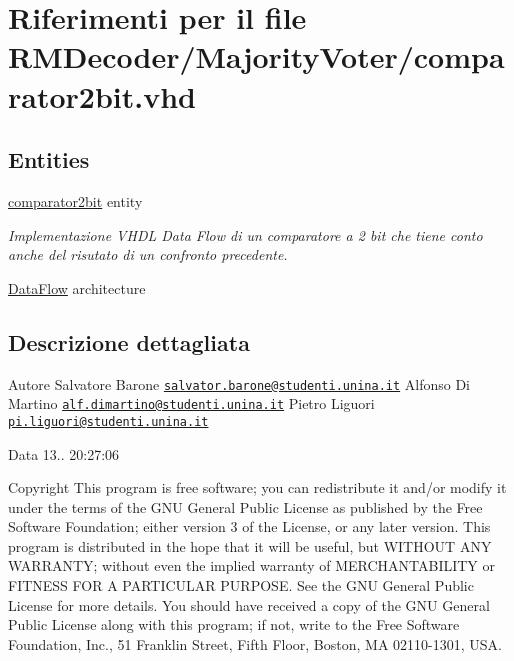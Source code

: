 \hypertarget{comparator2bit_8vhd}{\section{Riferimenti per il file R\+M\+Decoder/\+Majority\+Voter/comparator2bit.vhd}
\label{comparator2bit_8vhd}
}
\subsection*{Entities}
\begin{DoxyCompactItemize}
\item 
\hyperlink{classcomparator2bit}{comparator2bit} entity
\begin{DoxyCompactList}\small\item\em Implementazione V\+H\+D\+L Data Flow di un comparatore a 2 bit che tiene conto anche del risutato di un confronto precedente. \end{DoxyCompactList}\item 
\hyperlink{classcomparator2bit_1_1_data_flow}{Data\+Flow} architecture
\end{DoxyCompactItemize}


\subsection{Descrizione dettagliata}
\begin{DoxyAuthor}{Autore}
Salvatore Barone \href{mailto:salvator.barone@studenti.unina.it}{\tt salvator.\+barone@studenti.\+unina.\+it} Alfonso Di Martino \href{mailto:alf.dimartino@studenti.unina.it}{\tt alf.\+dimartino@studenti.\+unina.\+it} Pietro Liguori \href{mailto:pi.liguori@studenti.unina.it}{\tt pi.\+liguori@studenti.\+unina.\+it} 
\end{DoxyAuthor}
\begin{DoxyDate}{Data}
13.. 20\+:27\+:06
\end{DoxyDate}
\begin{DoxyCopyright}{Copyright}
This program is free software; you can redistribute it and/or modify it under the terms of the G\+N\+U General Public License as published by the Free Software Foundation; either version 3 of the License, or any later version. This program is distributed in the hope that it will be useful, but W\+I\+T\+H\+O\+U\+T A\+N\+Y W\+A\+R\+R\+A\+N\+T\+Y; without even the implied warranty of M\+E\+R\+C\+H\+A\+N\+T\+A\+B\+I\+L\+I\+T\+Y or F\+I\+T\+N\+E\+S\+S F\+O\+R A P\+A\+R\+T\+I\+C\+U\+L\+A\+R P\+U\+R\+P\+O\+S\+E. See the G\+N\+U General Public License for more details. You should have received a copy of the G\+N\+U General Public License along with this program; if not, write to the Free Software Foundation, Inc., 51 Franklin Street, Fifth Floor, Boston, M\+A 02110-\/1301, U\+S\+A. 
\end{DoxyCopyright}
